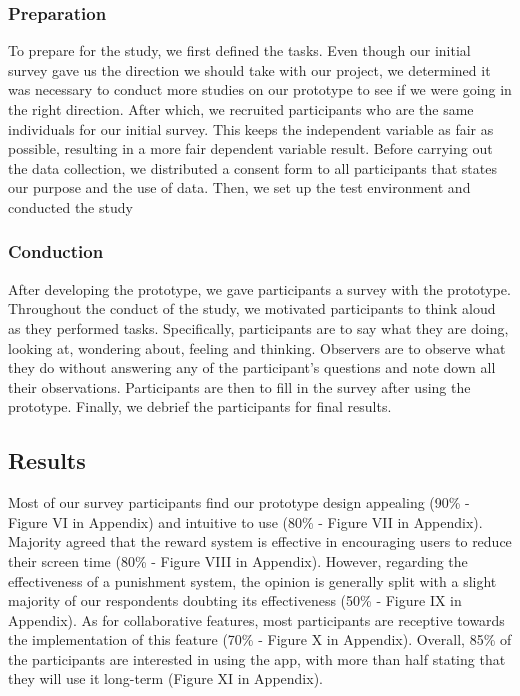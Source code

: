 \documentclass[sigconf, 11pt]{acmart}
\begin{document}
\subsubsection{Preparation}
To prepare for the study, we first defined the tasks. Even though our initial survey gave us the direction we should take with our project, we determined it was necessary to conduct more studies on our prototype to see if we were going in the right direction. After which, we recruited participants who are the same individuals for our initial survey. This keeps the independent variable as fair as possible, resulting in a more fair dependent variable result. Before carrying out the data collection, we distributed a consent form to all participants that states our purpose and the use of data. Then, we set up the test environment and conducted the study

\subsubsection{Conduction}
After developing the prototype, we gave participants a survey with the prototype. Throughout the conduct of the study, we motivated participants to think aloud as they performed tasks. Specifically, participants are to say what they are doing, looking at, wondering about, feeling and thinking. Observers are to observe what they do without answering any of the participant’s questions and note down all their observations. Participants are then to fill in the survey after using the prototype. Finally, we debrief the participants for final results.

\subsection{Results}
Most of our survey participants find our prototype design appealing (90\% - Figure VI in Appendix) and intuitive to use (80\% - Figure VII in Appendix). Majority agreed that the reward system is effective in encouraging users to reduce their screen time (80\% - Figure VIII in Appendix). However, regarding the effectiveness of a punishment system, the opinion is generally split with a slight majority of our respondents doubting its effectiveness (50\% - Figure IX in Appendix). As for collaborative features, most participants are receptive towards the implementation of this feature (70\% - Figure X in Appendix). Overall, 85\% of the participants are interested in using the app, with more than half stating that they will use it long-term (Figure XI in Appendix).
\end{document}
